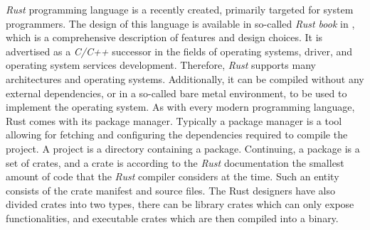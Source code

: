 \textit{Rust} programming language is a recently created, primarily targeted for system programmers. The design of this language is available in so-called \textit{Rust book} in \cite{rustbook}, which is a comprehensive description of features and design choices.  It is advertised as a \textit{C/C++} successor in the fields of operating systems, driver, and operating system services development. Therefore, \textit{Rust} supports many architectures and operating systems. Additionally, it can be compiled without any external dependencies, or in a so-called bare metal environment, to be used to implement the operating system. As with every modern programming language, Rust comes with its package manager. Typically a package manager is a tool allowing for fetching and configuring the dependencies required to compile the project. A project is a directory containing a package. Continuing, a package is a set of crates, and a crate is according to the \textit{Rust} documentation the smallest amount of code that the \textit{Rust} compiler considers at the time. Such an entity consists of the crate manifest and source files. The Rust designers have also divided crates into two types, there can be library crates which can only expose functionalities, and executable crates which are then compiled into a binary.

